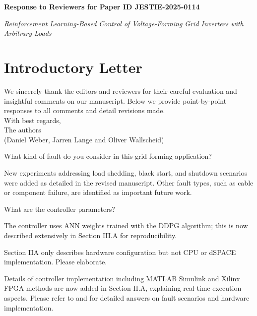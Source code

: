 \documentclass[a4paper,11pt]{article}
\newcommand{\paperid}{JESTIE-2025-0114}
\newcommand{\papertitle}{Reinforcement Learning-Based Control of Voltage-Forming Grid Inverters with Arbitrary Loads}
\begin{document}
\begin{center}
    {\Large \textbf{Response to Reviewers for Paper ID \paperid}}
\end{center}

\begin{center}
    {\large \textit{\papertitle}}
\end{center}

\vspace{1em}

\section*{Introductory Letter}
We sincerely thank the editors and reviewers for their careful evaluation and insightful comments on our manuscript. Below we provide point-by-point responses to all comments and detail revisions made.\\

\noindent With best regards,\\
The authors \\
{(Daniel Weber, Jarren Lange and Oliver Wallscheid)}


\begin{question}[q:method]
What kind of fault do you consider in this grid-forming application?
\end{question}
\begin{answer}[a:method]
New experiments addressing load shedding, black start, and shutdown scenarios were added as detailed in the revised manuscript. Other fault types, such as cable or component failure, are identified as important future work.
\end{answer}

\begin{question}[q:params]
What are the controller parameters?
\end{question}
\begin{answer}[a:params]
The controller uses ANN weights trained with the DDPG algorithm; this is now described extensively in Section III.A for reproducibility.
\end{answer}


\begin{question}[q:hardware]
Section IIA only describes hardware configuration but not CPU or dSPACE implementation. Please elaborate.
\end{question}
\begin{answer}[a:hardware]
Details of controller implementation including MATLAB Simulink and Xilinx FPGA methods are now added in Section II.A, explaining real-time execution aspects.
Please refer to  and  for detailed answers on fault scenarios and hardware implementation.
\end{answer}
\end{document}
